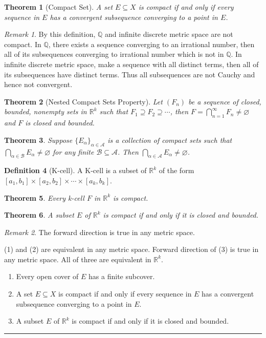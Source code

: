 \documentclass[12pt, lettersize]{book}
\theoremstyle{plain}
\newtheorem{thm}{Theorem}[section]
\theoremstyle{definition}
\newtheorem{dfn}[thm]{Definition}
\theoremstyle{remark}
\newtheorem*{rem}{Remark}
\newcommand{\R}{\mathbb{R}}
\newcommand{\Q}{\mathbb{Q}}
\newcommand{\lline}{\noindent\rule{\textwidth}{1pt}}
\let\emptyset\varnothing
\begin{document}
	\begin{thm}[Compact Set]
		A set $E\subseteq X$ is compact if and only if every sequence in $E$ has a convergent subsequence converging to a point in $E$.
	\end{thm}
	\begin{rem}
		By this definition, $\Q$ and infinite discrete metric space are not compact. In $\Q$, there exists a sequence converging to an irrational number, then all of its subsequences converging to irrational number which is not in $\Q$. In infinite discrete metric space, make a sequence with all distinct terms, then all of its subsequences have distinct terms. Thus all subsequences are not Cauchy and hence not convergent.
	\end{rem}
	
	\begin{thm}[Nested Compact Sets Property]
		Let $(F_n)$ be a sequence of closed, bounded, nonempty sets in $\R^k$ such that $F_1\supseteq F_2\supseteq\cdots$, then $F=\bigcap_{n=1}^{\infty}F_n\neq\emptyset$ and $F$ is closed and bounded.
	\end{thm}
	
	\begin{thm}
		Suppose $\{E_\alpha\}_{\alpha\in\mathcal{A}}$ is a collection of compact sets such that $\bigcap_{\alpha\in\mathcal{B}}E_\alpha\neq\emptyset$ for any finite $\mathcal{B}\subseteq \mathcal{A}$. Then $\bigcap_{\alpha\in\mathcal{A}}E_\alpha\neq\emptyset$.
	\end{thm}
	
	\begin{dfn}[K-cell]
		A K-cell is a subset of $\R^k$ of the form $[a_1,b_1]\times[a_2,b_2]\times\cdots\times[a_k,b_k]$.
	\end{dfn}
	
	\begin{thm}
		Every k-cell $F$ in $\mathbb{R}^k$ is compact.
	\end{thm}
	
	\begin{thm}
		A subset $E$ of $\mathbb{R}^k$ is compact if and only if it is closed and bounded.
	\end{thm}
	\begin{rem}
		The forward direction is true in any metric space.
	\end{rem}
	
	\begin{tcolorbox}[title=\textbf{Characterization of compact sets}]
		(1) and (2) are equivalent in any metric space. Forward direction of (3) is true in any metric space. All of three are equivalent in $\R^k$.
		\begin{enumerate}
			\item Every open cover of $E$ has a finite subcover.
			\item A set $E\subseteq X$ is compact if and only if every sequence in $E$ has a convergent subsequence converging to a point in $E$.
			\item A subset $E$ of $\mathbb{R}^k$ is compact if and only if it is closed and bounded.
		\end{enumerate}
	\end{tcolorbox}
	\lline
	
\end{document}
